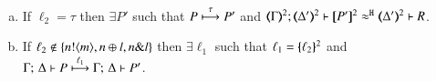 \begin{proposition}
\begin{enumerate}[1.]
\begin{enumerate}[a)]
				\item   
					If  %
					$\ell_2 = \tau$ 
					then $\exists P'$ such that
					$P \stackrel{\tau}{\longmapsto} P'$
					and $\horel{\mapt{\Gamma}^{2}}{\mapt{\Delta'}^{2}}{\map{P'}^{2}}{\hwb}{\mapt{\Delta'}^{2}}{R}$.
				\item	 
					If  
					$\ell_2 \not\in \{n ! \langle m \rangle, n \oplus l, n \& l\}$ 
					 then 
					$\exists \ell_1$ such that 
					$\ell_1 = \{\!\!\{\ell_2\}\!\!\}^{2}$ and \\
					$ \Gamma ;\, \Delta  \vdash   P
					\stackrel{\ell_1}{\longmapsto}
					\Gamma ;\, \Delta  \vdash   P'$.
		\end{enumerate}
	\end{enumerate}
\end{proposition}


